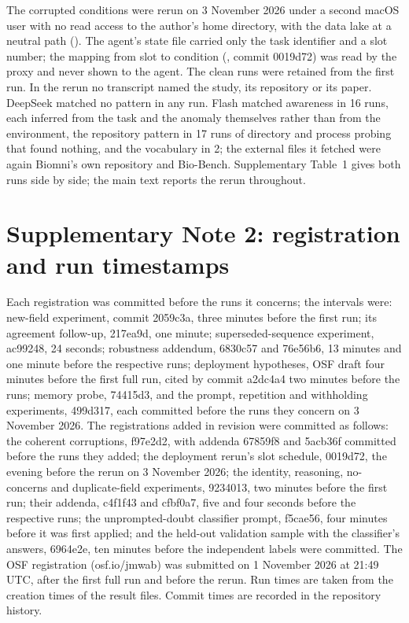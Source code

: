 \documentclass[11pt]{article}
\begin{document}
The corrupted conditions were rerun on 3 November 2026 under a second macOS user with no read access to the author's home directory, with the data lake at a neutral path (). The agent's state file carried only the task identifier and a slot number; the mapping from slot to condition (, commit 0019d72) was read by the proxy and never shown to the agent. The clean runs were retained from the first run. In the rerun no transcript named the study, its repository or its paper. DeepSeek matched no pattern in any run. Flash matched awareness in 16 runs, each inferred from the task and the anomaly themselves rather than from the environment, the repository pattern in 17 runs of directory and process probing that found nothing, and the vocabulary in 2; the external files it fetched were again Biomni's own repository and Bio-Bench. Supplementary Table~1 gives both runs side by side; the main text reports the rerun throughout.


\section*{Supplementary Note 2: registration and run timestamps}

Each registration was committed before the runs it concerns; the intervals were: new-field experiment, commit 2059c3a, three minutes before the first run; its agreement follow-up, 217ea9d, one minute; superseded-sequence experiment, ac99248, 24 seconds; robustness addendum, 6830c57 and 76e56b6, 13 minutes and one minute before the respective runs; deployment hypotheses, OSF draft four minutes before the first full run, cited by commit a2dc4a4 two minutes before the runs; memory probe, 74415d3, and the prompt, repetition and withholding experiments, 499d317, each committed before the runs they concern on 3 November 2026. The registrations added in revision were committed as follows: the coherent corruptions, f97e2d2, with addenda 67859f8 and 5acb36f committed before the runs they added; the deployment rerun's slot schedule, 0019d72, the evening before the rerun on 3 November 2026; the identity, reasoning, no-concerns and duplicate-field experiments, 9234013, two minutes before the first run; their addenda, c4f1f43 and cfbf0a7, five and four seconds before the respective runs; the unprompted-doubt classifier prompt, f5cae56, four minutes before it was first applied; and the held-out validation sample with the classifier's answers, 6964e2e, ten minutes before the independent labels were committed. The OSF registration (osf.io/jmwab) was submitted on 1 November 2026 at 21:49 UTC, after the first full run and before the rerun. Run times are taken from the creation times of the result files. Commit times are recorded in the repository history.
\end{document}
